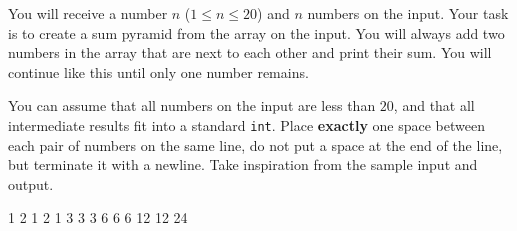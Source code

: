 




You will receive a number $n$ ($1\leq n \leq 20$) and $n$ numbers on the input. Your task is to create a sum pyramid from the array on the input. You will always add two numbers in the array that are next to each other and print their sum. You will continue like this until only one number remains.

You can assume that all numbers on the input are less than $20$, and that all intermediate results fit into a standard \texttt{int}. Place \textbf{exactly} one space between each pair of numbers on the same line, do not put a space at the end of the line, but terminate it with a newline. Take inspiration from the sample input and output.

1 2 1 2 1
 3 3 3
6 6 6
12 12
24
\koniec


